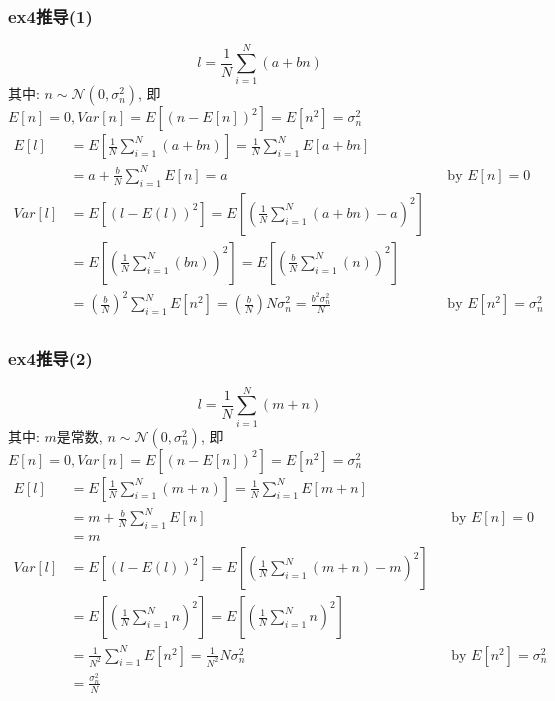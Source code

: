 \begin{frame}[shrink]
\frametitle{ex4推导(1)}
\[l=\frac{1}{N}\sum\limits_{i=1}^{N}(a+bn)\]
其中: $n\sim\mathcal{N}(0,\sigma_n^2)$, 即$E[n]=0,Var[n]=E\left[(n-E[n])^2\right]=E[n^2]=\sigma_n^2$
\begin{align*}
E[l]&=E\left[\frac{1}{N}\sum\limits_{i=1}^{N}(a+bn)\right]=\frac{1}{N}\sum\limits_{i=1}^{N}E[a+bn]\\
&=a+\frac{b}{N}\sum\limits_{i=1}^{N}E[n]=a &&\text{by } E[n]=0\\
Var[l]&=E[(l-E(l))^2]=E\left[\left(\frac{1}{N}\sum\limits_{i=1}^{N}(a+bn)-a\right)^2\right]\\
&=E\left[\left(\frac{1}{N}\sum\limits_{i=1}^{N}(bn)\right)^2\right]=E\left[\left(\frac{b}{N}\sum\limits_{i=1}^{N}(n)\right)^2\right]\\
&=(\frac{b}{N})^2\sum\limits_{i=1}^{N}E[n^2]=(\frac{b}{N})N\sigma_n^2=\frac{b^2\sigma_n^2}{N} &&\text{by } E[n^2]=\sigma_n^2\\
\end{align*}
\end{frame}

\begin{frame}[shrink]
\frametitle{ex4推导(2)}
\[l=\frac{1}{N}\sum\limits_{i=1}^{N}(m+n)\]
其中: $m$是常数, $n\sim\mathcal{N}(0,\sigma_n^2)$, 即$E[n]=0,Var[n]=E\left[(n-E[n])^2\right]=E[n^2]=\sigma_n^2$
\begin{align*}
E[l]&=E\left[\frac{1}{N}\sum\limits_{i=1}^{N}(m+n)\right]=\frac{1}{N}\sum\limits_{i=1}^{N}E[m+n]\\
&=m+\frac{b}{N}\sum\limits_{i=1}^{N}E[n] &&\text{by } E[n]=0\\
&=m\\
Var[l]&=E[(l-E(l))^2]=E\left[\left(\frac{1}{N}\sum\limits_{i=1}^{N}(m+n)-m\right)^2\right]\\
&=E\left[\left(\frac{1}{N}\sum\limits_{i=1}^{N}n\right)^2\right]=E\left[\left(\frac{1}{N}\sum\limits_{i=1}^{N}n\right)^2\right]\\
&=\frac{1}{N^2}\sum\limits_{i=1}^{N}E[n^2]=\frac{1}{N^2}N\sigma_n^2 &&\text{by } E[n^2]=\sigma_n^2\\
&=\frac{\sigma_n^2}{N}
\end{align*}
\end{frame}

